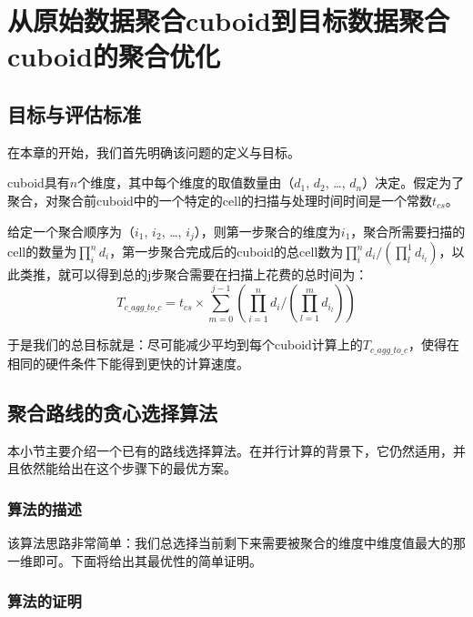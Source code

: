 \chapter{从原始数据聚合cuboid到目标数据聚合cuboid的聚合优化}
\section{目标与评估标准}
在本章的开始，我们首先明确该问题的定义与目标。

cuboid具有$n$个维度，其中每个维度的取值数量由（$d_1$, $d_2$, …, $d_n$）决定。假定为了聚合，对聚合前cuboid中的一个特定的cell的扫描与处理时间时间是一个常数$t_{cs}$。

给定一个聚合顺序为（$i_1$, $i_2$, …, $i_j$），则第一步聚合的维度为$i_1$，聚合所需要扫描的cell的数量为$\prod_{i}^{n} d_i$，第一步聚合完成后的cuboid的总cell数为$\prod_{i}^{n} d_i / (\prod_{l}^{1} d_{i_l})$，以此类推，就可以得到总的j步聚合需要在扫描上花费的总时间为：
\begin{equation}
T_{c\_agg\_to\_c} = t_{cs} \times \sum_{m = 0}^{j - 1} (\prod_{i = 1}^{n} d_i / (\prod_{l = 1}^{m} d_{i_l}))
\end{equation}

于是我们的总目标就是：尽可能减少平均到每个cuboid计算上的$T_{c\_agg\_to\_c}$，使得在相同的硬件条件下能得到更快的计算速度。

\section{聚合路线的贪心选择算法}
本小节主要介绍一个已有的路线选择算法。在并行计算的背景下，它仍然适用，并且依然能给出在这个步骤下的最优方案。

\subsection{算法的描述}
该算法思路非常简单：我们总选择当前剩下来需要被聚合的维度中维度值最大的那一维即可。下面将给出其最优性的简单证明。

\subsection{算法的证明}

